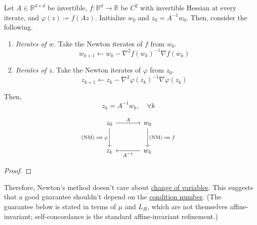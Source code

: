 	\begin{lemma}
	  \label{thm:affine-invariance}
		Let $A \in \mathbb{R}^{d \times d}$ be invertible, $f: \mathbb{R}^d \to \mathbb{R}$ be $C^2$ with invertible Hessian at every iterate, and $\varphi(z) \coloneqq f(A z)$. Initialize $w_0$ and $z_0 = A^{-1} w_0$. Then, consider the following. 
		\begin{enumerate}
		  \item \textit{Iterates of $w$}. Take the Newton iterates of $f$ from $w_0$. 
				\begin{equation}
					w_{k+1} \gets w_k - \nabla^2 f(w_k)^{-1} \nabla f(w_k)
				\end{equation}
		  \item \textit{Iterates of $z$}. Take the Newton iterates of $\varphi$ from $z_0$. 
				\begin{equation}
					z_{k+1} \gets z_k - \nabla^2 \varphi(z_k)^{-1} \nabla \varphi(z_k)
				\end{equation}
		\end{enumerate}
		Then, 
		\begin{equation}
			z_k = A^{-1} w_k, \quad \forall k
		\end{equation}

		\begin{equation}
			\begin{tikzcd}[column sep=large, row sep=large]
			z_0 \arrow[r, "A"] \arrow[d, "\text{(NM) on } \varphi"'] 
				& w_0 \arrow[d, "\text{(NM) on } f"] \\
			z_k 
				& w_k \arrow[l, "A^{-1}"]
			\end{tikzcd}
		\end{equation}
	\end{lemma}
	\begin{proof}
	  
	\end{proof}

	Therefore, Newton's method doesn't care about \hyperref[real-thm:change-of-variable]{change of variables}. This suggests that a good guarantee shouldn't depend on the \hyperref[def:condition-number]{condition number}. (The guarantee below is stated in terms of $\mu$ and $L_H$, which are not themselves affine-invariant; self-concordance is the standard affine-invariant refinement.) 

